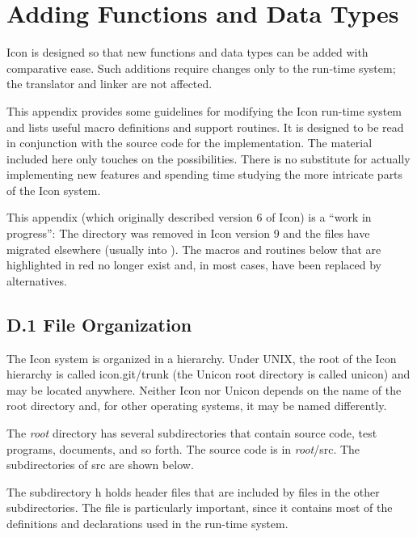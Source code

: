 \tablehead{}
\tablefirsthead{}
\tabletail{}
\tablelasttail{}

\chapter{Adding Functions and Data Types}

Icon is designed so that new functions and data types can be added
with comparative ease. Such additions require changes only to the
run-time system; the translator and linker are not affected.

This appendix provides some guidelines for modifying the Icon run-time
system and lists useful macro definitions and support routines. It is
designed to be read in conjunction with the source code for the
implementation. The material included here only touches on the
possibilities. There is no substitute for actually implementing new
features and spending time studying the more intricate parts of the
Icon system.

{\color{red}
This appendix (which originally described version 6 of Icon) is a ``work in
progress'': The  directory was removed in Icon version 9 and
the files have migrated elsewhere (usually into ). The
macros and routines below that are highlighted in red no longer exist and,
in most cases, have been replaced by alternatives.  }

\section[D.1 File Organization]{D.1 File Organization}

The Icon system is organized in a hierarchy. Under UNIX, the root of
the Icon hierarchy is called icon.git/trunk {\color{blue} (the Unicon
root directory is called unicon)} and may be located anywhere.
Neither Icon nor Unicon depends on the name of the root directory and,
for other operating systems, it may be named differently.

The {\it root} directory has several subdirectories that contain
source code, test programs, documents, and so forth. The source code
is in {\it root}/src.  The subdirectories of src are shown below.

The subdirectory h holds header files that are included by files in the
other subdirectories. The file  is particularly important,
since it contains most of the definitions and declarations used in the
run-time system.

